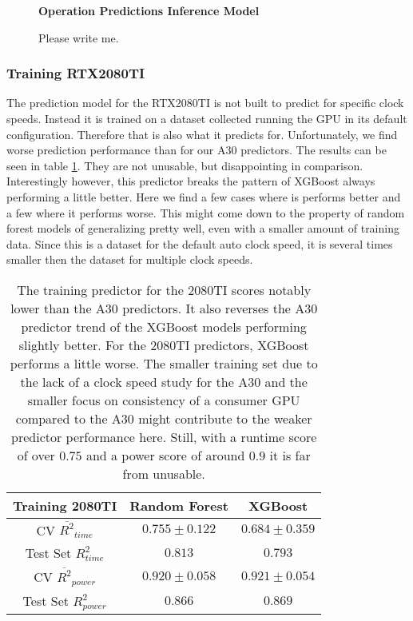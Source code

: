 \begin{figure}[htbp]
    \centering
    \parbox{1.1\textwidth}{\centering\textbf{Operation Predictions Inference Model}}
    \caption{Please write me.}
    \label{fig:testsetops_inf}
\end{figure}


\subsubsection{Training RTX2080TI}

The prediction model for the RTX2080TI is not built to predict for specific clock speeds. Instead it is trained on a dataset collected running the GPU in its default configuration. Therefore that is also what it predicts for. Unfortunately, we find worse prediction performance than for our A30 predictors. The results can be seen in table \ref{tab:pred_res_2080}. They are not unusable, but disappointing in comparison. Interestingly however, this predictor breaks the pattern of XGBoost always performing a little better. Here we find a few cases where is performs better and a few where it performs worse. This might come down to the property of random forest models of generalizing pretty well, even with a smaller amount of training data. Since this is a dataset for the default auto clock speed, it is several times smaller then the dataset for multiple clock speeds. 

\begin{table}[h!]
\centering
\begin{tabular}{|c|c|c|}
\hline
 \textbf{Training 2080TI}& \textbf{Random Forest} & \textbf{XGBoost} \\
\hline
CV $\overline{R^2}_{time}$ & $0.755 \pm 0.122$ &  $0.684 \pm 0.359$ \\
\hline
Test Set $R^2_{time}$ & $0.813$ & $0.793$ \\
\hline
CV $\overline{R^2}_{power}$ & $0.920 \pm 0.058$  &  $0.921 \pm 0.054$\\
\hline
Test Set $R^2_{power}$ & $0.866$ & $0.869$ \\
\hline
\end{tabular}
\caption{The training predictor for the 2080TI scores notably lower than the A30 predictors. It also reverses the A30 predictor trend of the XGBoost models performing slightly better. For the 2080TI predictors, XGBoost performs a little worse. The smaller training set due to the lack of a clock speed study for the A30 and the smaller focus on consistency of a consumer GPU compared to the A30 might contribute to the weaker predictor performance here. Still, with a runtime score of over $0.75$ and a power score of around $0.9$ it is far from unusable.}
\label{tab:pred_res_2080}
\end{table}

